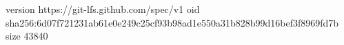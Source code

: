 version https://git-lfs.github.com/spec/v1
oid sha256:6d07f721231ab61e0e249c25cf93b98ad1e550a31b828b99d16bef3f8969fd7b
size 43840
